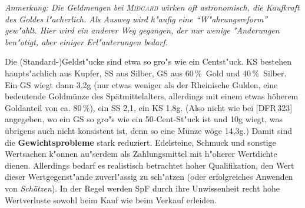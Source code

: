 \documentclass[10pt,a4paper,germanpar]{article}
\begin{document}
\emph{Anmerkung: Die Geldmengen bei \textsc{Midgard} wirken oft
  astronomisch, die Kaufkraft des Goldes l"acherlich. Als Ausweg wird
  h"aufig eine "`W"ahrungsreform"' gew"ahlt. Hier wird ein anderer Weg
  gegangen, der nur wenige "Anderungen ben"otigt, aber einiger
  Erl"auterungen bedarf.}

Die (Standard-)Geldst"ucke sind etwa so gro"s wie ein Centst"uck. KS
bestehen haupts"achlich aus Kupfer, SS aus Silber, GS aus 60\,\%\ Gold
und 40\,\%\ Silber. Ein GS wiegt dann 3,2g (nur etwas weniger als der
Rheinische Gulden, eine bedeutende Goldmünze des Spätmittelalters,
allerdings mit einem etwas höherem Goldanteil von ca. 80\,\%), ein SS
2,1, ein KS 1,8g. (Also nicht wie bei [DFR\,323] angegeben, wo ein GS
so gro"s wie ein 50-Cent-St"uck ist und 10g wiegt, was übrigens auch
nicht konsistent ist, denn so eine Münze wöge 14,3g.) Damit sind die
\textbf{Gewichtsprobleme} stark reduziert. Edelsteine, Schmuck und
sonstige Wertsachen k"onnen au"serdem als Zahlungsmittel mit h"oherer
Wertdichte dienen. Allerdings bedarf es realistisch betrachtet hoher
Qualifikation, den Wert dieser Wertgegenst"ande zuverl"assig zu
sch"atzen (oder erfolgreiches Anwenden von \emph{Schätzen}). In der
Regel werden SpF durch ihre Unwissenheit recht hohe Wertverluste
sowohl beim Kauf wie beim Verkauf erleiden.

\end{document}
